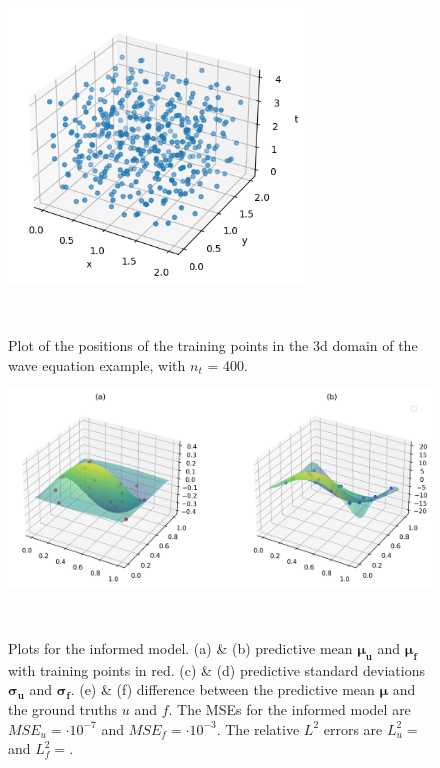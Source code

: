 \documentclass{article}
\begin{document}
\begin{figure}
    \centering
    \includegraphics[width=0.7\textwidth]{../final_examples/wave_equation/training_points.png}
    \caption{Plot of the positions of the training points in the 3d domain of the wave equation example, with $n_t$ = 400. }
    ~\label{fig:training_points_wave}
\end{figure}

\begin{figure}
    \centering
    \includegraphics[width=1\textwidth]{../final_examples/wave_equation/predictive_mean.png}
    \caption{Plots for the informed model. (a) \& (b) predictive mean $\bm{\mu_u}$ and $\bm{\mu_f}$ with training points in red. (c) \& (d) predictive standard deviations $\bm{\sigma_u}$ and $\bm{\sigma_f}$. (e) \& (f) difference between the predictive mean $\bm{\mu}$ and the ground truths $u$ and $f$. The MSEs for the informed model are $MSE_u =  \cdot 10^{-7}$ and $MSE_f =  \cdot 10^{-3}$. The relative $L^2$ errors are $L^2_u = $ and $L^2_f = $.}
    ~\label{fig:wave}
\end{figure}
\end{document}

